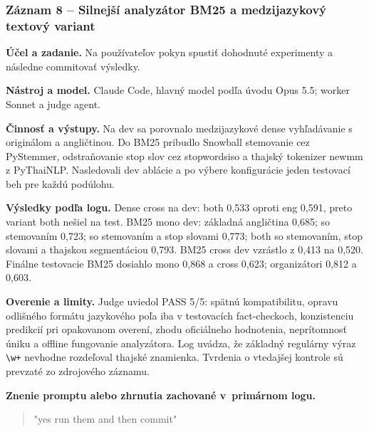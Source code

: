 \subsubsection*{Záznam 8 -- Silnejší analyzátor BM25 a medzijazykový textový variant}


\par\noindent \textbf{Účel a zadanie.} Na používateľov pokyn spustiť dohodnuté experimenty a následne commitovať výsledky.\par\smallskip
\par\noindent \textbf{Nástroj a model.} Claude Code, hlavný model podľa úvodu Opus 5.5; worker Sonnet a judge agent.\par\smallskip
\par\noindent \textbf{Činnosť a výstupy.} Na dev sa porovnalo medzijazykové dense vyhľadávanie s originálom a angličtinou. Do BM25 pribudlo Snowball stemovanie cez PyStemmer, odstraňovanie stop slov cez stopwordsiso a thajský tokenizer newmm z PyThaiNLP. Nasledovali dev ablácie a po výbere konfigurácie jeden testovací beh pre každú podúlohu.\par\smallskip
\par\noindent \textbf{Výsledky podľa logu.} Dense cross na dev: both 0,533 oproti eng 0,591, preto variant both nešiel na test. BM25 mono dev: základná angličtina 0,685; so stemovaním 0,723; so stemovaním a stop slovami 0,773; both so stemovaním, stop slovami a thajskou segmentáciou 0,793. BM25 cross dev vzrástlo z 0,413 na 0,520. Finálne testovacie BM25 dosiahlo mono 0,868 a cross 0,623; organizátori 0,812 a 0,603.\par\smallskip
\par\noindent \textbf{Overenie a limity.} Judge uviedol PASS 5/5: spätnú kompatibilitu, opravu odlišného formátu jazykového poľa iba v testovacích fact-checkoch, konzistenciu predikcií pri opakovanom overení, zhodu oficiálneho hodnotenia, neprítomnosť úniku a offline fungovanie analyzátora. Log uvádza, že základný regulárny výraz \texttt{\textbackslash{}w+} nevhodne rozdeľoval thajské znamienka. Tvrdenia o vtedajšej kontrole sú prevzaté zo zdrojového záznamu.\par\smallskip

\par\noindent\textbf{Znenie promptu alebo zhrnutia zachované v~primárnom logu.}

\begin{quote}\normalsize "yes run them and then commit"\end{quote}


